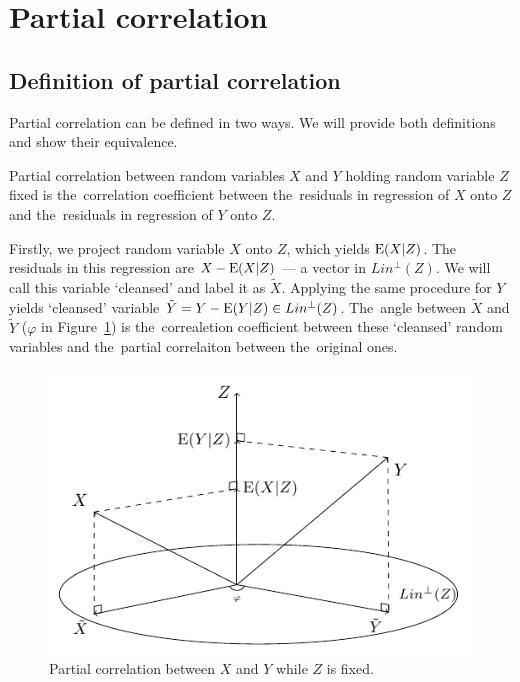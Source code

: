 \section{Partial correlation}

\subsection{Definition of partial correlation}


Partial correlation can be defined in two ways.
We will provide both definitions and show their equivalence.

\begin{definition}
Partial correlation between random variables $X$ and $Y$ holding random variable $Z$
fixed is the~correlation coefficient between the~residuals in regression of $X$ onto
$Z$ and the~residuals in regression of $Y$ onto $Z$.
\end{definition}

Firstly, we project random variable $X$ onto $Z$, which yields $\operatorname{E}(X \vert Z)$.
The residuals in this regression are $X - \operatorname{E}(X \vert Z)$ — a vector in $Lin^{\perp}(Z)$.
We will call this variable `cleansed' and label it as $\widetilde X$.
Applying the same procedure for $Y$ yields `cleansed' variable $\tilde Y = Y - \operatorname{E}(Y \vert Z) \in Lin^{\perp}(Z)$.
The~angle between $\widetilde X$ and $\widetilde Y$ ($\varphi$ in Figure~\ref{fig:pcorr_def1})
is the~correaletion coefficient between these `cleansed' random variables and
the~partial correlaiton between the~original ones.

\begin{figure}
\centering
\includegraphics[width=0.55\linewidth]{figures/03_partial_correlation_definition.pdf}
\caption{Partial correlation between $X$ and $Y$ while $Z$ is fixed.}
\label{fig:pcorr_def1}
\end{figure}

